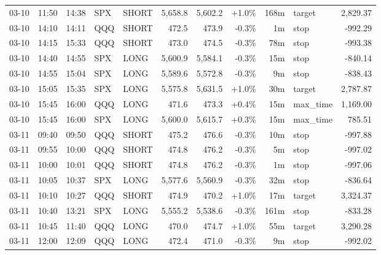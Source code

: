 \documentclass[11pt,a4paper,twoside]{article}
\begin{document}
\begin{center}
\begin{longtable}{>{\color{txtmain}}l l l l l r r r r >{\color{txtmain}}l r}
03-10 & 11:50 & 14:38 & SPX & SHORT & 5,658.8 & 5,602.2 & \textcolor{wingreen}{+1.0\%} & 168m & target & \textcolor{wingreen}{2,829.37} \\
03-10 & 14:10 & 14:11 & QQQ & SHORT & 472.5 & 473.9 & \textcolor{lossred}{-0.3\%} & 1m & stop & \textcolor{lossred}{-992.29} \\
03-10 & 14:15 & 15:33 & QQQ & SHORT & 473.0 & 474.5 & \textcolor{lossred}{-0.3\%} & 78m & stop & \textcolor{lossred}{-993.38} \\
03-10 & 14:40 & 14:55 & SPX & LONG & 5,600.9 & 5,584.1 & \textcolor{lossred}{-0.3\%} & 15m & stop & \textcolor{lossred}{-840.14} \\
03-10 & 14:55 & 15:04 & SPX & LONG & 5,589.6 & 5,572.8 & \textcolor{lossred}{-0.3\%} & 9m & stop & \textcolor{lossred}{-838.43} \\
03-10 & 15:05 & 15:35 & SPX & LONG & 5,575.8 & 5,631.5 & \textcolor{wingreen}{+1.0\%} & 30m & target & \textcolor{wingreen}{2,787.87} \\
03-10 & 15:45 & 16:00 & QQQ & LONG & 471.6 & 473.3 & \textcolor{wingreen}{+0.4\%} & 15m & max\_time & \textcolor{wingreen}{1,169.00} \\
03-10 & 15:45 & 16:00 & SPX & LONG & 5,600.0 & 5,615.7 & \textcolor{wingreen}{+0.3\%} & 15m & max\_time & \textcolor{wingreen}{785.51} \\
03-11 & 09:40 & 09:50 & QQQ & SHORT & 475.2 & 476.6 & \textcolor{lossred}{-0.3\%} & 10m & stop & \textcolor{lossred}{-997.88} \\
03-11 & 09:55 & 10:00 & QQQ & SHORT & 474.8 & 476.2 & \textcolor{lossred}{-0.3\%} & 5m & stop & \textcolor{lossred}{-997.02} \\
03-11 & 10:00 & 10:01 & QQQ & SHORT & 474.8 & 476.2 & \textcolor{lossred}{-0.3\%} & 1m & stop & \textcolor{lossred}{-997.06} \\
03-11 & 10:05 & 10:37 & SPX & LONG & 5,577.6 & 5,560.9 & \textcolor{lossred}{-0.3\%} & 32m & stop & \textcolor{lossred}{-836.64} \\
03-11 & 10:10 & 10:27 & QQQ & SHORT & 474.9 & 470.2 & \textcolor{wingreen}{+1.0\%} & 17m & target & \textcolor{wingreen}{3,324.37} \\
03-11 & 10:40 & 13:21 & SPX & LONG & 5,555.2 & 5,538.6 & \textcolor{lossred}{-0.3\%} & 161m & stop & \textcolor{lossred}{-833.28} \\
03-11 & 10:45 & 11:40 & QQQ & LONG & 470.0 & 474.7 & \textcolor{wingreen}{+1.0\%} & 55m & target & \textcolor{wingreen}{3,290.28} \\
03-11 & 12:00 & 12:09 & QQQ & LONG & 472.4 & 471.0 & \textcolor{lossred}{-0.3\%} & 9m & stop & \textcolor{lossred}{-992.02} \\

\end{longtable}
\end{center}
\end{document}
